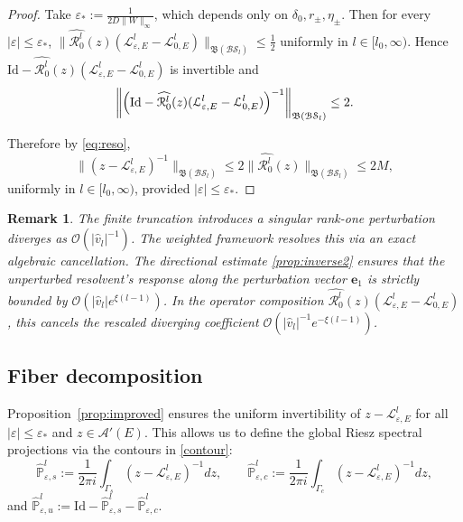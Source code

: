 \documentclass[reqno,11pt]{amsart}
\newtheorem{remark}{Remark}[section]
\begin{document}
\begin{proof}
Take
$
\varepsilon_\ast:=\frac{1}{2D\|W\|_\infty}
$, which depends only on $\delta_0, r_\pm,\eta_\pm$. 
Then for every $|\varepsilon|\le \varepsilon_\ast$,
$
\|\widehat{\mathcal{R}^{l}_{0}}(z)(\mathcal{L}^{l}_{\varepsilon,E}-\mathcal{L}^{l}_{0,E})\|_{\mathfrak{B}(\mathcal{BS}_l )}
\le \frac12
$
uniformly in $l\in[l_0,\infty)$.
Hence
$
\mathrm{Id}-\widehat{\mathcal{R}^{l}_{0}}(z)(\mathcal{L}^{l}_{\varepsilon,E}-\mathcal{L}^{l}_{0,E})
$
is invertible and
$$
\left\|\Bigl(
\mathrm{Id}-\widehat{\mathcal{R}^{l}_{0}}(z)(\mathcal{L}^{l}_{\varepsilon,E}-\mathcal{L}^{l}_{0,E})\Bigr)^{-1}
\right\|_{\mathfrak{B}(\mathcal{BS}_l )}
\le 2.
$$

Therefore by \eqref{eq:reso}, 
$$
\bigl\|(z-\mathcal{L}^{l}_{\varepsilon,E})^{-1}\bigr\|_{\mathfrak{B}(\mathcal{BS}_l )}
\le 2\bigl\|\widehat{\mathcal{R}^{l}_{0}}(z)\bigr\|_{\mathfrak{B}(\mathcal{BS}_l )} \le 2M,
$$
uniformly in $l\in[l_0,\infty)$, provided $|\varepsilon|\le\varepsilon_\ast$.
\end{proof}



\begin{remark}\label{rem:mechanism}
The finite truncation introduces a singular rank-one perturbation diverges as $\mathcal{O}(|\hat{v}_l|^{-1})$. The weighted framework resolves this via an exact algebraic cancellation. The directional estimate \eqref{prop:inverse2} ensures that the unperturbed resolvent's response along the perturbation vector $\mathbf{e}_1$ is strictly bounded by $\mathcal{O}(|\hat{v}_l| e^{\xi(l-1)})$. In the operator composition $\widehat{\mathcal{R}^{l}_{0}}(z)(\mathcal{L}^{l}_{\varepsilon,E} - \mathcal{L}^{l}_{0,E})$, this  cancels the rescaled diverging coefficient $\mathcal{O}(|\hat{v}_l|^{-1}e^{-\xi(l-1)})$. 
\end{remark}

\subsection{Fiber decomposition}

Proposition~\ref{prop:improved} ensures the uniform invertibility of $z-\mathcal{L}^{l}_{\varepsilon,E}$ for all $|\varepsilon|\le\varepsilon_\ast$ and $z\in\mathcal{A}'(E)$. This allows us to define the global Riesz spectral projections via the contours in \eqref{contour}:
$$
\widehat{\mathbb P}^l_{\varepsilon,s} := \frac{1}{2\pi i}\int_{\Gamma_s} (z-\mathcal{L}^{l}_{\varepsilon,E})^{-1} dz, \qquad
\widehat{\mathbb P}^l_{\varepsilon,c} := \frac{1}{2\pi i} \int_{\Gamma_c} (z-\mathcal{L}^{l}_{\varepsilon,E})^{-1}dz,
$$
and $\widehat{\mathbb P}^l_{\varepsilon,u} := \mathrm{Id} - \widehat{\mathbb P}^l_{\varepsilon,s} - \widehat{\mathbb P}^l_{\varepsilon,c}$.
\end{document}
